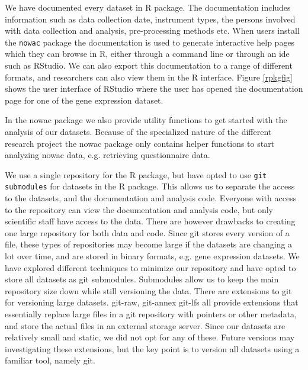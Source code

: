 We have documented every dataset in R package. The documentation includes
information such as data collection date, instrument types, the persons involved
with data collection and analysis, pre-processing methods etc.  When users
install the \texttt{nowac} package the documentation is used to generate
interactive help pages which they can browse in R, either through a command line
or through an \gls{ide} such as RStudio.  We can also export this documentation
to a range of different formats, and researchers can also view them in the R
interface. Figure \ref{rpkgfig} shows the user interface of RStudio where the
user has opened the documentation page for one of the gene expression dataset. 

In the \gls{nowac} package we also provide utility functions to get started with
the analysis of our datasets. Because of the specialized nature of the different
research project the \gls{nowac} package only contains helper functions to start
analyzing \gls{nowac} data, e.g. retrieving questionnaire data. 

We use a single repository for the R package, but have opted to use \texttt{git
submodules} for datasets in the R package.  This allows us to separate the
access to the datasets, and the documentation and analysis code. Everyone with
access to the repository can view the documentation and analysis code, but only
scientific staff have access to the data.  There are however drawbacks to
creating one large repository for both data and code. Since git stores every
version of a file, these types of repositories may become large if the datasets
are changing a lot over time, and are stored in binary formats, e.g. gene
expression datasets. We have explored different techniques to minimize our
repository and have opted to store all datasets as git
submodules\cite{submodule}. Submodules allow us to keep the main repository size
down while still versioning the data.  There are extensions to git for
versioning large datasets. git-raw\cite{gitraw}, git-annex\cite{gitannex}
git-lfs\cite{gitlfs} all provide extensions that essentially replace 
large files in a git repository with pointers or other metadata, and store the
actual files in an external storage server. Since our datasets are relatively
small and static, we did not opt for any of these. Future versions may
investigating these extensions, but the key point is to version all datasets
using a familiar tool, namely git. 

